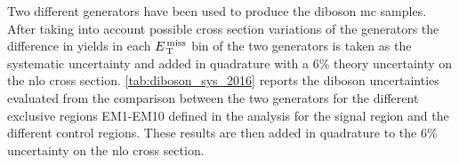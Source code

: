 Two different generators have been used to produce the diboson \gls{mc}
samples. After taking into account possible cross section variations of the
generators the difference in yields in each $E_\mathrm{\, T}^\mathrm{\, miss}$ bin of the two generators is
taken as the systematic uncertainty and added in quadrature with a 6\% theory
uncertainty on the \gls{nlo} cross section. \cref{tab:diboson_sys_2016} reports
the diboson uncertainties evaluated from the comparison between the two
generators for the different exclusive regions EM1-EM10 defined in the analysis
for the signal region and the different control regions. These results are then
added in quadrature to the 6\% uncertainty on the \gls{nlo} cross section.
\begin{table}[!ht]
  \centering
\caption{Relative systematic uncertainties in \% on the diboson background as a
  function of the exclusive bins EM1-EM10 defined in the analysis for the signal
  region and the different control regions as evaluated from the comparison
  between the generators. These values are then added in quadrature with a 6\%
  uncertainty on the \gls{nlo} cross section.}
  \label{tab:diboson_sys_2016}
\end{table}
